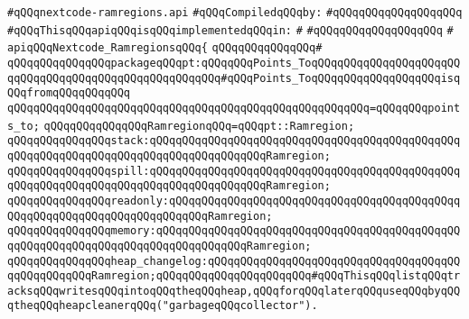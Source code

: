 \label{src/lib/compiler/back/low/main/nextcode/nextcode-ramregions.api}
\verb|#qQQqnextcode-ramregions.api|\newline
\newline
\verb|#qQQqCompiledqQQqby:|\newline
\verb|#qQQqqQQqqQQqqQQqqQQq|\newline
\newline
\verb|#qQQqThisqQQqapiqQQqisqQQqimplementedqQQqin:|\newline
\verb|#|\newline
\verb|#qQQqqQQqqQQqqQQqqQQq|\newline
\verb|#|\newline
\verb|apiqQQqNextcode_RamregionsqQQq{|\newline
\verb|qQQqqQQqqQQqqQQq#|\newline
\verb|qQQqqQQqqQQqqQQqpackageqQQqpt:qQQqqQQqPoints_ToqQQqqQQqqQQqqQQqqQQqqQQqqQQqqQQqqQQqqQQqqQQqqQQqqQQqqQQq#qQQqPoints_ToqQQqqQQqqQQqqQQqqQQqisqQQqfromqQQqqQQqqQQq|\newline
\verb|qQQqqQQqqQQqqQQqqQQqqQQqqQQqqQQqqQQqqQQqqQQqqQQqqQQqqQQq=qQQqqQQqpoints_to;|\newline
\newline
\verb|qQQqqQQqqQQqqQQqRamregionqQQq=qQQqpt::Ramregion;|\newline
\newline
\verb|qQQqqQQqqQQqqQQqstack:qQQqqQQqqQQqqQQqqQQqqQQqqQQqqQQqqQQqqQQqqQQqqQQqqQQqqQQqqQQqqQQqqQQqqQQqqQQqqQQqqQQqqQQqRamregion;|\newline
\verb|qQQqqQQqqQQqqQQqspill:qQQqqQQqqQQqqQQqqQQqqQQqqQQqqQQqqQQqqQQqqQQqqQQqqQQqqQQqqQQqqQQqqQQqqQQqqQQqqQQqqQQqqQQqRamregion;|\newline
\verb|qQQqqQQqqQQqqQQqreadonly:qQQqqQQqqQQqqQQqqQQqqQQqqQQqqQQqqQQqqQQqqQQqqQQqqQQqqQQqqQQqqQQqqQQqqQQqqQQqRamregion;|\newline
\verb|qQQqqQQqqQQqqQQqmemory:qQQqqQQqqQQqqQQqqQQqqQQqqQQqqQQqqQQqqQQqqQQqqQQqqQQqqQQqqQQqqQQqqQQqqQQqqQQqqQQqqQQqRamregion;|\newline
\newline
\verb|qQQqqQQqqQQqqQQqheap_changelog:qQQqqQQqqQQqqQQqqQQqqQQqqQQqqQQqqQQqqQQqqQQqqQQqqQQqRamregion;qQQqqQQqqQQqqQQqqQQqqQQq#qQQqThisqQQqlistqQQqtracksqQQqwritesqQQqintoqQQqtheqQQqheap,qQQqforqQQqlaterqQQquseqQQqbyqQQqtheqQQqheapcleanerqQQq("garbageqQQqcollector").|\newline
